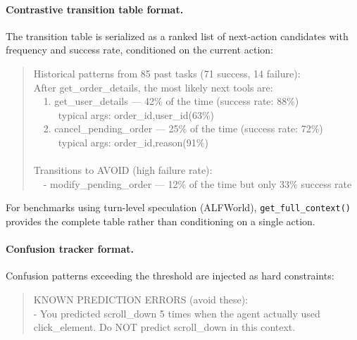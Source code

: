 \documentclass{article}
\begin{document}
\paragraph{Contrastive transition table format.}
The transition table is serialized as a ranked list of next-action
candidates with frequency and success rate, conditioned on the current
action:
\begin{quote}
\small\ttfamily
Historical patterns from 85 past tasks (71 success, 14 failure):\\
After get\_order\_details, the most likely next tools are:\\
~~1. get\_user\_details --- 42\% of the time (success rate: 88\%)\\
~~~~~typical args: order\_id,user\_id(63\%)\\
~~2. cancel\_pending\_order --- 25\% of the time (success rate: 72\%)\\
~~~~~typical args: order\_id,reason(91\%)\\
\\
Transitions to AVOID (high failure rate):\\
~~- modify\_pending\_order --- 12\% of the time but only 33\% success rate
\end{quote}
For benchmarks using turn-level speculation (ALFWorld), \texttt{get\_full\_context()}
provides the complete table rather than conditioning on a single action.

\paragraph{Confusion tracker format.}
Confusion patterns exceeding the threshold are injected as hard constraints:
\begin{quote}
\small\ttfamily
KNOWN PREDICTION ERRORS (avoid these):\\
- You predicted scroll\_down 5 times when the agent actually used\\
\phantom{-~}click\_element. Do NOT predict scroll\_down in this context.
\end{quote}



% 
\end{document}
